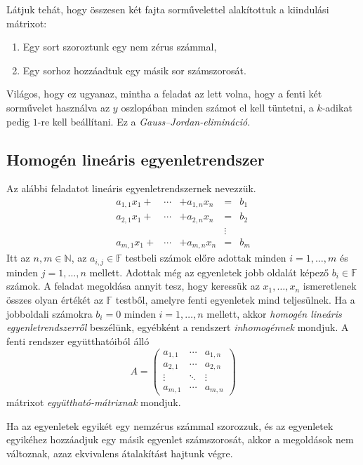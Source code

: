 \documentclass[9pt, a4paper, showtrims]{memoir}
\theoremstyle{plain}
\theoremstyle{remark}
\theoremstyle{definition}
\begin{document}
Látjuk tehát, hogy összesen két fajta sorművelettel alakítottuk a kiindulási mátrixot:
\begin{enumerate}
    \item Egy sort szoroztunk egy nem zérus számmal,
    \item Egy sorhoz hozzáadtuk egy másik sor számszorosát.
\end{enumerate}
Világos, hogy ez ugyanaz, mintha a feladat az lett volna, 
hogy a fenti két sorművelet használva az $y$ oszlopában minden számot el kell tüntetni, 
a $k$-adikat pedig $1$-re kell beállítani.
Ez a \emph{Gauss--Jordan-elimináció}.

\subsection{Homogén lineáris egyenletrendszer}
Az alábbi feladatot lineáris egyenletrendszernek nevezzük.
\[
    \begin{array}{rrlcl}
        a_{1,1}x_1+&\cdots&+a_{1,n}x_n&=& b_1\\
        a_{2,1}x_1+&\cdots&+a_{2,n}x_n&=&b_2\\
        &&&\vdots&\\
        a_{m,1}x_1+&\cdots&+a_{m,n}x_n&=& b_m
    \end{array}
\]
Itt az $n,m\in\mathbb{N}$, az $a_{i,j}\in\mathbb{F}$ testbeli számok előre adottak
minden $i=1,\dots,m$ és minden $j=1,\dots,n$ mellett.
Adottak még az egyenletek jobb oldalát képező $b_i\in\mathbb{F}$ számok.
A feladat megoldása annyit tesz, hogy keressük az $x_1,\dots,x_n$ ismeretlenek 
összes olyan értékét az $\mathbb{F}$ testből,
amelyre fenti egyenletek mind teljesülnek.
Ha a jobboldali számokra $b_i=0$ minden $i=1,\dots,n$ mellett,
akkor 
\emph{homogén lineáris egyenletrendszerről}%
beszélünk,
egyébként a rendszert
\emph{inhomogénnek}%
mondjuk.
A fenti rendszer együtthatóiból álló
\[
    A=
    \begin{pmatrix}
        a_{1,1}&\cdots&a_{1,n}\\
        a_{2,1}&\cdots&a_{2,n}\\
        \vdots&\ddots&\vdots\\
        a_{m,1}&\cdots&a_{m,n}
    \end{pmatrix}
\]
mátrixot 
\emph{együttható-mátrixnak}%
mondjuk.

Ha az egyenletek egyikét egy nemzérus számmal szorozzuk,
és az egyenletek egyikéhez hozzáadjuk egy másik egyenlet számszorosát,
akkor a megoldások nem változnak, 
azaz ekvivalens átalakítást hajtunk végre.
\end{document}
